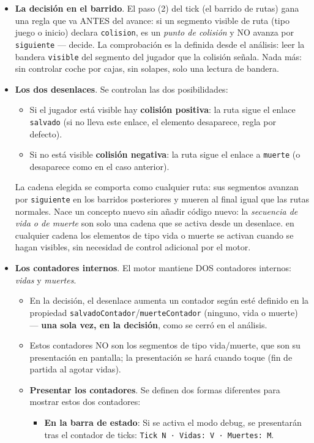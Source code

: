 \begin{itemize}
	\item \textbf{La decisión en el barrido}. El paso (2) del tick (el barrido de
	rutas) gana una regla que va ANTES del avance: si un segmento visible de ruta
	(tipo juego o inicio) declara \texttt{colision}, es un \emph{punto de colisión} y
	NO avanza por \texttt{siguiente} --- decide. La comprobación es la definida desde
	el análisis: leer la bandera \texttt{visible} del segmento del jugador que la
	colisión señala. Nada más: sin controlar coche por cajas, sin solapes, solo una lectura de bandera.
	\item \textbf{Los dos desenlaces}. Se controlan las dos posibilidades:
	\begin{itemize}
		\item Si el jugador está visible hay \textbf{colisión positiva}: la ruta sigue el enlace \texttt{salvado} (si no
		lleva este enlace, el elemento desaparece, regla por defecto).
		\item Si no está visible \textbf{colisión negativa}: la ruta sigue el enlace a \texttt{muerte} (o desaparece como en el caso anterior). 
	\end{itemize}
	La cadena
	elegida se comporta como cualquier ruta: sus segmentos avanzan por
	\texttt{siguiente} en los barridos posteriores y mueren al final igual que las
	rutas normales. Nace un concepto nuevo sin añadir código nuevo: la \emph{secuencia de vida o de
		muerte} son solo una cadena que se activa desde un desenlace. en cualquier cadena los elementos de tipo vida o muerte se activan cuando se hagan visibles, sin necesidad de control adicional por el motor.
	\item \textbf{Los contadores internos}. El motor mantiene DOS contadores internos: \emph{vidas} y \emph{muertes}. 
	
	\begin{itemize}
		\item En la decisión, el desenlace aumenta un contador según esté definido en la propiedad  \texttt{salvadoContador}/\texttt{muerteContador} (ninguno, vida o muerte) --- \textbf{una sola vez, en la decisión}, como se cerró en el análisis.
		\item Estos contadores NO son los segmentos de tipo vida/muerte, que son su presentación en pantalla; la presentación se hará cuando toque (fin de partida al agotar vidas). 
		
		\item \textbf{Presentar los contadores}. Se definen dos formas diferentes para mostrar estos dos contadores:
		\begin{itemize}
			\item \textbf{En la barra de estado}: Si se activa el modo debug, se presentarán tras el contador de ticks: \texttt{Tick N · Vidas: V · Muertes: M}. 
			

\end{itemize}
\end{itemize}
\end{itemize}
